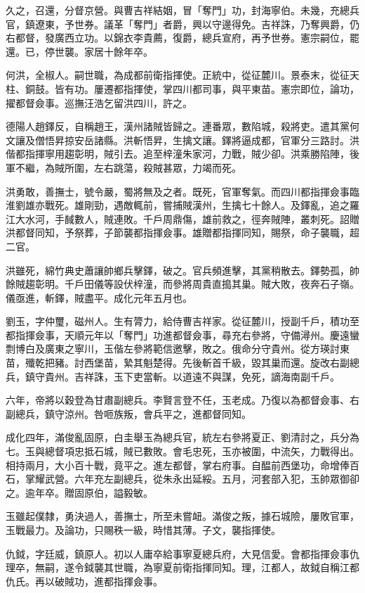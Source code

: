 \begin{pinyinscope}
久之，召還，分督京營。與曹吉祥結姻，冒「奪門」功，封海寧伯。未幾，充總兵官，鎮遼東，予世券。議革「奪門」者爵，興以守邊得免。吉祥誅，乃奪興爵，仍右都督，發廣西立功。以錦衣李貴薦，復爵，總兵宣府，再予世券。憲宗嗣位，罷還。已，停世襲。家居十餘年卒。

何洪，全椒人。嗣世職，為成都前衛指揮使。正統中，從征麓川。景泰末，從征天柱、銅鼓。皆有功。屢遷都指揮使，掌四川都司事，與平東苗。憲宗即位，論功，擢都督僉事。巡撫汪浩乞留洪四川，許之。

德陽人趙鐸反，自稱趙王，漢州諸賊皆歸之。連番眾，數陷城，殺將吏。遣其黨何文讓及僧悟昇掠安岳諸縣。洪斬悟昇，生擒文讓。鐸將逼成都，官軍分三路討。洪偕都指揮寧用趨彰明，賊引去。追至梓潼朱家河，力戰，賊少卻。洪乘勝陷陣，後軍不繼，為賊所圍，左右跳蕩，殺賊甚眾，力竭而死。

洪勇敢，善撫士，號令嚴，蜀將無及之者。既死，官軍奪氣。而四川都指揮僉事臨淮劉雄亦戰死。雄剛勁，遇敵輒前，嘗捕賊漢州，生擒七十餘人。及鐸亂，追之羅江大水河，手馘數人，賊連敗。千戶周鼎傷，雄前救之，徑奔賊陣，叢刺死。詔贈洪都督同知，予祭葬，子節襲都指揮僉事。雄贈都指揮同知，賜祭，命子襲職，超二官。

洪雖死，綿竹典史蕭讓帥鄉兵擊鐸，破之。官兵頻進擊，其黨稍散去。鐸勢孤，帥餘賊趨彰明。千戶田儀等設伏梓潼，而參將周貴直搗其巢。賊大敗，夜奔石子嶺。儀亟進，斬鐸，賊盡平。成化元年五月也。

劉玉，字仲璽，磁州人。生有膂力，給侍曹吉祥家。從征麓川，授副千戶，積功至都指揮僉事，天順元年以「奪門」功進都督僉事，尋充右參將，守備潯州。慶遠蠻剽博白及廣東之寧川，玉偕左參將範信邀擊，敗之。俄命分守貴州。從方瑛討東苗，殲乾把豬。討西堡苗，縶其魁楚得。先後斬首千級，毀其巢而還。旋改右副總兵，鎮守貴州。吉祥誅，玉下吏當斬。以道遠不與謀，免死，謫海南副千戶。

六年，帝將以穀登為甘肅副總兵。李賢言登不任，玉老成。乃復以為都督僉事、右副總兵，鎮守涼州。咎咂族叛，會兵平之，進都督同知。

成化四年，滿俊亂固原，白圭舉玉為總兵官，統左右參將夏正、劉清討之，兵分為七。玉與總督項忠抵石城，賊已數敗。會毛忠死，玉亦被圍，中流矢，力戰得出。相持兩月，大小百十戰，竟平之。進左都督，掌右府事。自醖前西堡功，命增俸百石，掌耀武營。六年充左副總兵，從朱永出延綏。五月，河套部入犯，玉帥眾御卻之。逾年卒。贈固原伯，謚毅敏。

玉雖起僕隸，勇決過人，善撫士，所至未嘗衄。滿俊之叛，據石城險，屢敗官軍，玉戰最力。及論功，只賜秩一級，時惜其薄。子文，襲指揮使。

仇鉞，字廷威，鎮原人。初以人庸卒給事寧夏總兵府，大見信愛。會都指揮僉事仇理卒，無嗣，遂令鉞襲其世職，為寧夏前衛指揮同知。理，江都人，故鉞自稱江都仇氏。再以破賊功，進都指揮僉事。


\end{pinyinscope}
